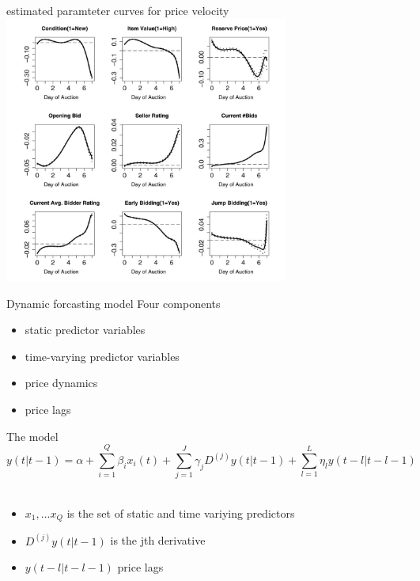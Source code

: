 \documentclass[hyperref={pdfpagelabels=false}]{beamer}
\begin{document}
\begin{frame}{estimated paramteter curves for price velocity}
\center
\includegraphics[width=0.7\textwidth]{price_velocity} %
\end{frame} %

\begin{frame}{Dynamic forcasting model}
Four components
\begin{itemize}
	\item static predictor variables
	\item time-varying predictor variables
	\item price dynamics
	\item price lags
\end{itemize}	
\end{frame}

\begin{frame}{The model}
\begin{equation}
y(t|t-1)=\alpha+\sum_{i=1}^{Q}\beta_ix_i(t)+\sum_{j=1}^J\gamma_jD^{(j)}y(t|t-1)+\sum_{l=1}^L\eta_ly(t-l|t-l-1) \nonumber
\end{equation}
\newline \\
\begin{itemize}
	\item $x_1,...x_Q$ is the set of static and time variying predictors
	\item $D^{(j)}y(t|t-1)$ is the jth derivative
	\item $y(t-l|t-l-1)$ price lags
\end{itemize}
\end{frame}
\end{document}
